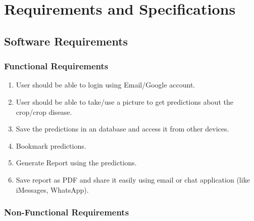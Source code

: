 \documentclass[../Report.tex]{subfiles}
\begin{document}
\chapter{Requirements and  Specifications}

\section{Software Requirements}

\subsection{Functional Requirements}

\begin{enumerate}
  \item User should be able to login using Email/Google account.
  
  \item User should be able to take/use a picture to get predictions about the crop/crop disease.
  
  \item Save the predictions in an database and access it from other devices.
  
  \item Bookmark predictions.
  
  \item Generate Report using the predictions.
  
  \item Save report as PDF and share it easily using email or chat application (like iMessages, WhatsApp).

\end{enumerate}

\subsection{Non-Functional Requirements}
\end{document}
